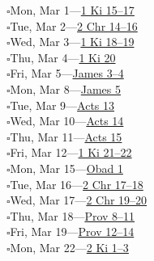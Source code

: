 \hypertarget{rp-2027-03-01}{}\noindent$\square$\enspace Mon, Mar 1\enspace---\enspace \hyperlink{ch-1kings-15}{1 Ki 15--17}\\
\hypertarget{rp-2027-03-02}{}\noindent$\square$\enspace Tue, Mar 2\enspace---\enspace \hyperlink{ch-2chronicles-14}{2 Chr 14--16}\\
\hypertarget{rp-2027-03-03}{}\noindent$\square$\enspace Wed, Mar 3\enspace---\enspace \hyperlink{ch-1kings-18}{1 Ki 18--19}\\
\hypertarget{rp-2027-03-04}{}\noindent$\square$\enspace Thu, Mar 4\enspace---\enspace \hyperlink{ch-1kings-20}{1 Ki 20}\\
\hypertarget{rp-2027-03-05}{}\noindent$\square$\enspace Fri, Mar 5\enspace---\enspace \hyperlink{ch-james-3}{James 3--4}\\
\hypertarget{rp-2027-03-08}{}\noindent$\square$\enspace Mon, Mar 8\enspace---\enspace \hyperlink{ch-james-5}{James 5}\\
\hypertarget{rp-2027-03-09}{}\noindent$\square$\enspace Tue, Mar 9\enspace---\enspace \hyperlink{ch-acts-13}{Acts 13}\\
\hypertarget{rp-2027-03-10}{}\noindent$\square$\enspace Wed, Mar 10\enspace---\enspace \hyperlink{ch-acts-14}{Acts 14}\\
\hypertarget{rp-2027-03-11}{}\noindent$\square$\enspace Thu, Mar 11\enspace---\enspace \hyperlink{ch-acts-15}{Acts 15}\\
\hypertarget{rp-2027-03-12}{}\noindent$\square$\enspace Fri, Mar 12\enspace---\enspace \hyperlink{ch-1kings-21}{1 Ki 21--22}\\
\hypertarget{rp-2027-03-15}{}\noindent$\square$\enspace Mon, Mar 15\enspace---\enspace \hyperlink{ch-obadiah-1}{Obad 1}\\
\hypertarget{rp-2027-03-16}{}\noindent$\square$\enspace Tue, Mar 16\enspace---\enspace \hyperlink{ch-2chronicles-17}{2 Chr 17--18}\\
\hypertarget{rp-2027-03-17}{}\noindent$\square$\enspace Wed, Mar 17\enspace---\enspace \hyperlink{ch-2chronicles-19}{2 Chr 19--20}\\
\hypertarget{rp-2027-03-18}{}\noindent$\square$\enspace Thu, Mar 18\enspace---\enspace \hyperlink{ch-proverbs-8}{Prov 8--11}\\
\hypertarget{rp-2027-03-19}{}\noindent$\square$\enspace Fri, Mar 19\enspace---\enspace \hyperlink{ch-proverbs-12}{Prov 12--14}\\
\hypertarget{rp-2027-03-22}{}\noindent$\square$\enspace Mon, Mar 22\enspace---\enspace \hyperlink{ch-2kings-1}{2 Ki 1--3}\\
